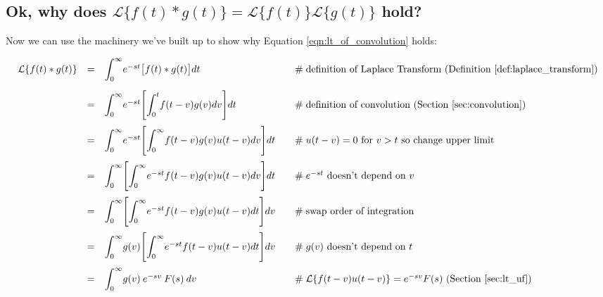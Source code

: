 \documentclass{article}
\theoremstyle{definition}
\begin{document}
\newpage
\subsection{Ok, why does $\mathcal{L}\{f(t) \ast g(t)\} =  \mathcal{L}\{f(t)\}\mathcal{L}\{g(t)\}$ hold?}

\bigskip
\noindent
Now we can use the machinery we've built up to show why Equation \ref{eqn:lt_of_convolution} holds:

\begin{equation*}
\begin{array}{lllll}
\mathcal{L}\{f(t) \ast g(t)\} 
&=& \mathlarger{\int}^\infty_0 e^{-st} \big [ f(t) \ast g(t) \big ] dt                                                                 &\quad \mathrel{\#} \text{definition of Laplace Transform (Definition \ref{def:laplace_transform})}            \\
[15pt]                 
&=& \mathlarger{\int}^\infty_0 e^{-st} \Bigg [ \mathlarger{\int}^t_0 f(t-v) g(v) dv \Bigg ] dt                         &\quad \mathrel{\#} \text{definition of convolution (Section \ref{sec:convolution})}                                     \\
[15pt]
&=& \mathlarger{\int}^\infty_0 e^{-st} \Bigg [ \mathlarger{\int}^\infty_0 f(t-v) g(v ) u(t-v) dv \Bigg ] dt        &\quad \mathrel{\#} \text{$u(t-v) = 0$ for $v > t$ so change upper limit}                                                    \\
[15pt]
&=& \mathlarger{\int}^\infty_0 \Bigg [ \mathlarger{\int}^\infty_0  e^{-st} f(t-v) g(v ) u(t-v) dv \Bigg ] dt       &\quad \mathrel{\#} \text{$e^{-st}$ doesn't depend on $v$}                                                                        \\    
[15pt]
&=& \mathlarger{\int}^\infty_0 \Bigg [ \mathlarger{\int}^\infty_0  e^{-st} f(t-v) g(v ) u(t-v) dt \Bigg ] dv       &\quad \mathrel{\#} \text{swap order of integration}                                                                                   \\    
[15pt]
&=& \mathlarger{\int}^\infty_0 g(v) \Bigg [ \mathlarger{\int}^\infty_0  e^{-st} f(t-v) u(t-v) dt \Bigg ] dv        &\quad \mathrel{\#} \text{$g(v)$ doesn't depend on $t$}                                                                             \\     
[15pt]
&=& \mathlarger{\int}^\infty_0 g(v) \: e^{-sv} \: F(s) \: dv                                                                            &\quad \mathrel{\#} \mathcal{L}\{ f(t-v) u(t-v)\} = e^{-sv} F(s) \text{ (Section \ref{sec:lt_uf})}                      \\

\end{array}
\end{equation*}
\end{document}
